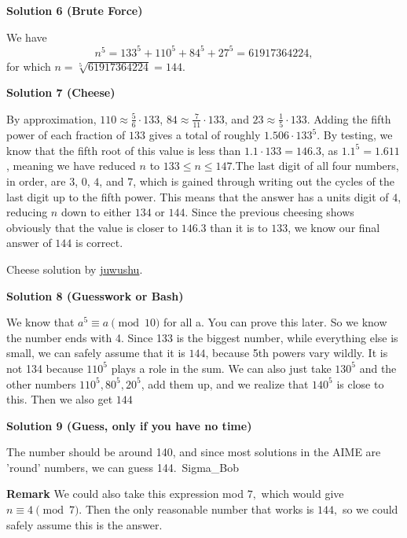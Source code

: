 \begin{enumerate}
 



\textbf{Solution 6 (Brute Force)}

We have 
 \[n^5 = 133^5 + 110^5 + 84^5 +27^5 = 61917364224,\] for which $n = \sqrt [5]{61917364224} = \boxed{144}.$




\textbf{Solution 7 (Cheese)}

By approximation, $110 \approx \frac{5}{6}\cdot133$, $84 \approx \frac{7}{11}\cdot133$, and $23 \approx \frac{1}{5}\cdot133$. Adding the fifth power of each fraction of $133$ gives a total of roughly $1.506\cdot133^5$. By testing, we know that the fifth root of this value is less than $1.1\cdot133=146.3$, as $1.1^5=1.611$, meaning we have reduced $n$ to $133\le{n}\le{147}$.The last digit of all four numbers, in order, are $3$, $0$, $4$, and $7$, which is gained through writing out the cycles of the last digit up to the fifth power. This means that the answer has a units digit of $4$, reducing $n$ down to either $134$ or $144$. Since the previous cheesing shows obviously that the value is closer to $146.3$ than it is to $133$, we know our final answer of $\boxed{144}$ is correct.

 Cheese solution by \href{https://artofproblemsolving.com/wiki/index.php?title=User:Juwushu}{juwushu}.

 



\textbf{Solution 8 (Guesswork or Bash)}

We know that $a^5 \equiv a \pmod{10}$ for all a. You can prove this later. So we know the number ends with 4. Since 133 is the biggest number, while everything else is small, we can safely assume that it is $\boxed{144}$, because 5th powers vary wildly. It is not 134 because $110^5$ plays a role in the sum.  We can also just take $130^5$ and the other numbers $110^5, 80^5,20^5$, add them up, and we realize that $140^5$ is close to this. Then we also get $\boxed{144}$




\textbf{Solution 9 (Guess, only if you have no time)}

The number should be around 140, and since most solutions in the AIME are 'round' numbers, we can guess 144.~Sigma\_Bob

 \textbf{Remark} We could also take this expression mod $7,$ which would give $n\equiv4\pmod{7}.$ Then the only reasonable number that works is $144,$ so we could safely assume this is the answer.


\end{enumerate}
